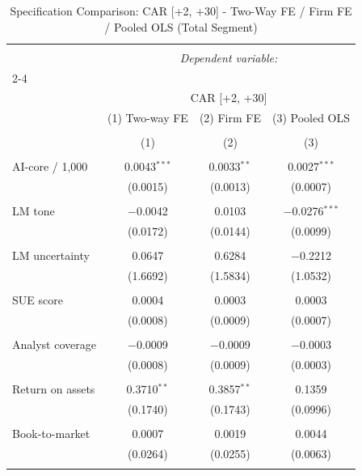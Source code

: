 
\begin{table}[!htbp] \centering 
  \caption{Specification Comparison: CAR [+2, +30] - Two-Way FE / Firm FE / Pooled OLS (Total Segment)} 
  \label{} 
\begin{tabular}{@{\extracolsep{5pt}}lccc} 
\\[-1.8ex]\hline 
\hline \\[-1.8ex] 
 & \multicolumn{3}{c}{\textit{Dependent variable:}} \\ 
\cline{2-4} 
\\[-1.8ex] & \multicolumn{3}{c}{CAR [+2, +30]} \\ 
 & (1) Two-way FE & (2) Firm FE & (3) Pooled OLS \\ 
\\[-1.8ex] & (1) & (2) & (3)\\ 
\hline \\[-1.8ex] 
 AI-core / 1,000 & 0.0043$^{***}$ & 0.0033$^{**}$ & 0.0027$^{***}$ \\ 
  & (0.0015) & (0.0013) & (0.0007) \\ 
  & & & \\ 
 LM tone & $-$0.0042 & 0.0103 & $-$0.0276$^{***}$ \\ 
  & (0.0172) & (0.0144) & (0.0099) \\ 
  & & & \\ 
 LM uncertainty & 0.0647 & 0.6284 & $-$0.2212 \\ 
  & (1.6692) & (1.5834) & (1.0532) \\ 
  & & & \\ 
 SUE score & 0.0004 & 0.0003 & 0.0003 \\ 
  & (0.0008) & (0.0009) & (0.0007) \\ 
  & & & \\ 
 Analyst coverage & $-$0.0009 & $-$0.0009 & $-$0.0003 \\ 
  & (0.0008) & (0.0009) & (0.0003) \\ 
  & & & \\ 
 Return on assets & 0.3710$^{**}$ & 0.3857$^{**}$ & 0.1359 \\ 
  & (0.1740) & (0.1743) & (0.0996) \\ 
  & & & \\ 
 Book-to-market & 0.0007 & 0.0019 & 0.0044 \\ 
  & (0.0264) & (0.0255) & (0.0063) \\ 
  & & & \\ 

\end{tabular}
\end{table}
